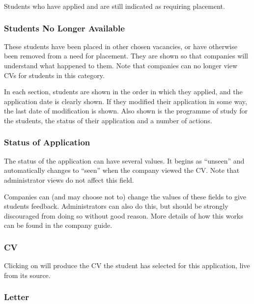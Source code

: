 \documentclass[12 pt]{book}
\begin{document}
Students who have applied and are still indicated as requiring placement.

\subsubsection{Students No Longer Available}

These students have been placed in other chosen vacancies, or have otherwise
been removed from a need for placement. They are shown so that companies will
understand what happened to them. Note that companies can no longer view CVs
for students in this category.

In each section, students are shown in the order in which they applied, and
the application date is clearly shown. If they modified their application in
some way, the last date of modification is shown. Also shown is the programme
of study for the students, the status of their application and a number of
actions.


\subsubsection{Status of Application}

The status of the application can have several values. It begins as ``unseen''
and automatically changes to ``seen'' when the company viewed the CV. Note that
administrator views do not affect this field.

Companies can (and may choose not to) change the values of these fields to
give students feedback. Administrators can also do this, but should be
strongly discouraged from doing so without good reason. More details of how
this works can be found in the company guide.

\subsubsection{CV}

Clicking on  will produce the CV the student has selected for this
application, live from its source.

\subsubsection{Letter}
\end{document}

